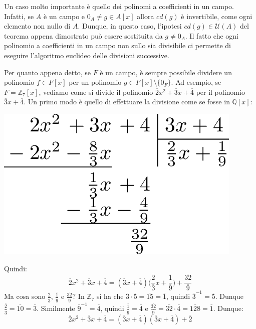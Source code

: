 Un caso molto importante è quello dei polinomi a coefficienti in un campo. Infatti, se $A$ è un campo e $0_{A} \neq g \in A[x]$ allora $cd(g)$ è invertibile, come ogni elemento non nullo di $A$. Dunque, in questo caso, l'ipotesi $cd(g) \in \mathcal{U}(A)$ del teorema appena dimostrato può essere sostituita da $g \neq 0_{A}$. Il fatto che ogni polinomio a coefficienti in un campo non sullo sia divisibile ci permette di eseguire l'algoritmo euclideo delle divisioni successive.



\begin{example}
	Per quanto appena detto, se $F$ è un campo, è sempre possibile dividere un polinomio $f \in F[x]$ per un polinomio $g \in F[x] \setminus \{0_{F}\}$. Ad esempio, se $F=\mathbb{Z}_{7}[x]$, vediamo come si divide il polinomio $\overline{2}x^{2}+\overline{3}x+\overline{4}$ per il polinomio $\overline{3}x+\overline{4}$. Un primo modo è quello di effettuare la divisione come se fosse in $\mathbb{Q}[x]$:
	\medskip
	
	\begin{center}
		\includegraphics[scale=.25]{res/Divisionez7}
	\end{center}
	\medskip
	
	Quindi:
	\[\overline{2}x^{2}+\overline{3}x+\overline{4} =(\overline{3}x+\overline{4})\Biggl(\frac{\overline{2}}{\overline{3}}x+\frac{\overline{1}}{\overline{9}}\Biggr)+\frac{\overline{32}}{\overline{9}}\]
	Ma cosa sono $\frac{\overline{2}}{\overline{3}}$, $\frac{\overline{1}}{\overline{9}}$ e $\frac{\overline{32}}{\overline{9}}$? In $\mathbb{Z}_{7}$ si ha che $\overline{3}\cdot \overline{5}=\overline{15}=\overline{1}$, quindi $\overline{3}^{-1}=\overline{5}$. Dunque $\frac{\overline{2}}{\overline{3}}=\overline{10}=\overline{3}$. Similmente $\overline{9}^{-1}=\overline{4}$, quindi $\frac{\overline{1}}{\overline{9}}=\overline{4}$ e $\frac{\overline{32}}{\overline{9}}=\overline{32}\cdot \overline{4}=\overline{128}=\overline{1}$. Dunque:
	\[\overline{2}x^{2}+\overline{3}x+\overline{4} =(\overline{3}x+\overline{4})(\overline{3}x+\overline{4})+\overline{2}\]
\end{example}


